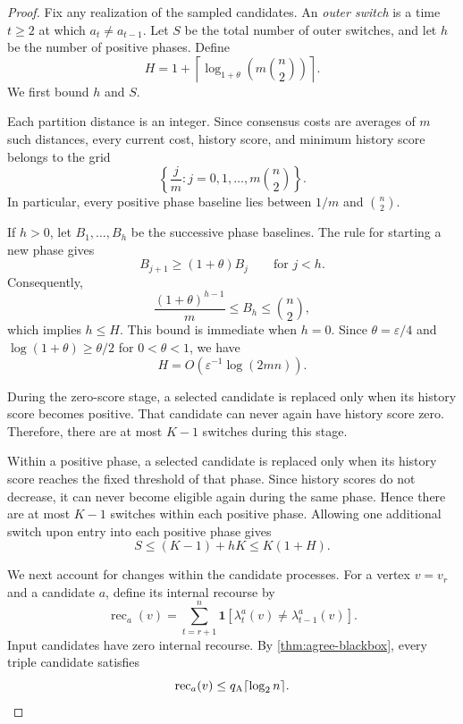 \documentclass[11pt]{article}
\theoremstyle{definition}
\theoremstyle{remark}
\newcommand{\1}{\mathbf{1}}
\begin{document}
\begin{proof}
Fix any realization of the sampled candidates. An \emph{outer switch}
is a time $t\geq 2$ at which $a_t\neq a_{t-1}$. Let $S$ be the total
number of outer switches, and let $h$ be the number of positive
phases. Define
\[
    H=
    1+
    \left\lceil
        \log_{1+\theta}\left(m\binom{n}{2}\right)
    \right\rceil.
\]
We first bound $h$ and $S$.

Each partition distance is an integer. Since consensus costs are
averages of $m$ such distances, every current cost, history score,
and minimum history score belongs to the grid
\[
    \left\{
        \frac{j}{m}:
        j=0,1,\ldots,m\binom{n}{2}
    \right\}.
\]
In particular, every positive phase baseline lies between $1/m$
and $\binom{n}{2}$.

If $h>0$, let $B_1,\ldots,B_h$ be the successive phase baselines.
The rule for starting a new phase gives
\[
    B_{j+1}\geq(1+\theta)B_j
    \qquad\text{for }j<h.
\]
Consequently,
\[
    \frac{(1+\theta)^{h-1}}{m}
    \leq
    B_h
    \leq
    \binom{n}{2},
\]
which implies $h\leq H$. This bound is immediate when $h=0$.
Since $\theta=\varepsilon/4$ and
$\log(1+\theta)\geq\theta/2$ for $0<\theta<1$, we have
\[
    H=O\!\left(\varepsilon^{-1}\log(2mn)\right).
\]

During the zero-score stage, a selected candidate is replaced only
when its history score becomes positive. That candidate can never
again have history score zero. Therefore, there are at most $K-1$
switches during this stage.

Within a positive phase, a selected candidate is replaced only
when its history score reaches the fixed threshold of that phase.
Since history scores do not decrease, it can never become eligible
again during the same phase. Hence there are at most $K-1$ switches
within each positive phase. Allowing one additional switch upon
entry into each positive phase gives
\[
    S
    \leq
    (K-1)+hK
    \leq
    K(1+H).
\]

We next account for changes within the candidate processes. For a
vertex $v=v_r$ and a candidate $a$, define its internal recourse by
\[
    \operatorname{rec}_a(v)
    =
    \sum_{t=r+1}^{n}
    \1[\lambda_t^a(v)\neq\lambda_{t-1}^a(v)].
\]
Input candidates have zero internal recourse. By
\cref{thm:agree-blackbox}, every triple candidate satisfies
\[
    \operatorname{rec}_a(v)
    \leq
    q_{\rm A}\lceil\log_2 n\rceil.
\]


\end{proof}
\end{document}
